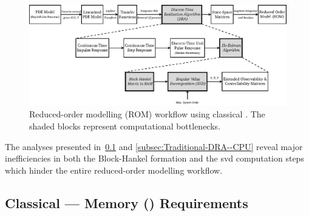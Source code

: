 \begin{figure}[!htbp]
    \centering
    \includegraphics[width=\textwidth]{traditional_dra.eps}
    \caption[%
    Reduced-order modelling (ROM) workflow using classical .
    ]%
    {%
        Reduced-order modelling (ROM) workflow using classical
        . The shaded blocks represent computational bottlenecks.
    }%
    \label{fig:traditional_ROM_Workflow}
\end{figure}

The    analyses     presented    in~\cref{subsec:Traditional-DRA--Memory}    and
\cref{subsec:Traditional-DRA--CPU}  reveal  major  inefficiencies  in  both  the
Block-Hankel  formation and  the \gls{svd}  computation steps  which hinder  the
entire reduced-order modelling workflow.

\subsection{Classical  --- Memory () Requirements}\label{subsec:Traditional-DRA--Memory}




